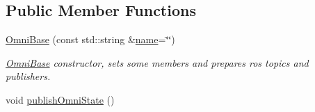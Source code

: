 \subsection*{Public Member Functions}
\begin{DoxyCompactItemize}
\item 
\hyperlink{classOmniBase_ab8717851c5496b3311ba0b48114e8004}{Omni\-Base} (const std\-::string \&\hyperlink{classOmniBase_a69efd9c11cdef64cbdcf57b52c6539f7}{name}=\char`\"{}\char`\"{})
\begin{DoxyCompactList}\small\item\em \hyperlink{classOmniBase}{Omni\-Base} constructor, sets some members and prepares ros topics and publishers. \end{DoxyCompactList}\item 
\hypertarget{classOmniBase_afd21d9d7906e46cb6feb4d963bf8b9c7}{void \hyperlink{classOmniBase_afd21d9d7906e46cb6feb4d963bf8b9c7}{publish\-Omni\-State} ()}\label{classOmniBase_afd21d9d7906e46cb6feb4d963bf8b9c7}


\end{DoxyCompactItemize}
